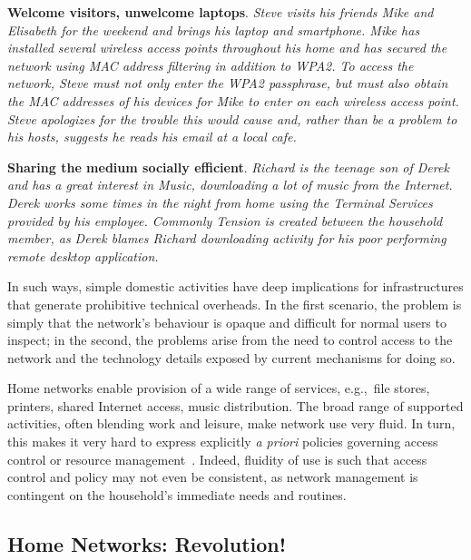 \textbf{Welcome visitors, unwelcome laptops}.  {\it Steve visits his friends
  Mike and Elisabeth for the weekend and brings his laptop and smartphone.  Mike
  has installed several wireless access points throughout his home and has
  secured the network using MAC address filtering in addition to WPA2.  To
  access the network, Steve must not only enter the WPA2 passphrase, but must
  also obtain the MAC addresses of his devices for Mike to enter on each
  wireless access point.  Steve apologizes for the trouble this would cause and,
  rather than be a problem to his hosts, suggests he reads his email at a local
  cafe.} 

\textbf{Sharing the medium socially efficient}.  {\it Richard is the teenage son
  of Derek and has a great interest in Music, downloading a lot of music from the
  Internet. Derek works some times in the night from home using the Terminal
  Services provided by his employee. Commonly Tension is created between the
  household member,  as Derek
  blames Richard downloading activity for his poor performing remote desktop
  application. } 

In such ways, simple domestic activities have deep implications for
infrastructures that generate prohibitive technical overheads.  In the first
scenario, the problem is simply that the network's behaviour is opaque and
difficult for normal users to inspect; in the second, the problems arise from
the need to control access to the network and the technology details exposed by
current mechanisms for doing so.  

Home networks enable provision of a wide range of services, e.g.,~file stores,
printers, shared Internet access, music distribution.  The broad range of
supported activities, often blending work and leisure, make network use very
fluid.  In turn, this makes it very hard to express explicitly \emph{a priori}
policies governing access control or resource management~\cite{tolmie07}.
Indeed, fluidity of use is such that access control and policy may not even be
consistent, as network management is contingent on the household's immediate
needs and routines.

\subsection{Home Networks: Revolution!} \label{s:revolution}

